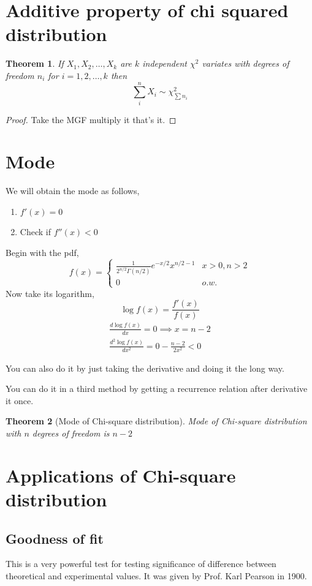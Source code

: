 \documentclass[oneside,11pt,pdftex]{book}%
\numberwithin{equation}{section}
\newtheorem{theorem}{Theorem}[chapter]%
\numberwithin{section}{chapter}
\numberwithin{equation}{chapter}
\begin{document}
\section{Additive property of chi squared distribution}
\begin{theorem}
	If $ X_1, X_2, \dots, X_k $ are $ k $ independent $ \chi^2 $ variates with degrees of freedom $ n_i $ for $ i=1,2,\dots,k $ then $$ \sum_i^n X_i \sim \chi^2_{\sum n_i}$$
\end{theorem}
\begin{proof}
	Take the MGF multiply it that's it.
\end{proof}

\section{Mode}
We will obtain the mode as follows,
\begin{enumerate}
	\item $ f'(x) =0$
	\item Check if $ f''(x)<0 $
\end{enumerate}

Begin with the pdf,
\[ f(x)=\begin{cases}
	\frac{1}{2^{n/2}\Gamma(n/2)}e^{-x/2}x^{n/2-1} & x>0, n>2\\
	0 & o.w.
\end{cases} \]
Now take its logarithm,
\[ \log f(x) = \frac{f'(x)}{f(x)}\]
\begin{align*}
	\frac{d \log f(x)}{dx}=0\implies x=n-2\\
	\frac{d^2 \log f(x)}{dx^2}=0-\frac{n-2}{2x^2}<0
\end{align*}

You can also do it by just taking the derivative and doing it the long way.

You can do it in a third method by getting a recurrence relation after derivative it once.


\begin{theorem}[Mode of Chi-square distribution]
	Mode of Chi-square distribution with $ n $ degrees of freedom is $ n-2 $
\end{theorem}


\section{Applications of Chi-square distribution}
\subsection{Goodness of fit}
This is a very powerful test for testing significance of difference between theoretical and experimental values. It was given by Prof. Karl Pearson in 1900.
\end{document}
